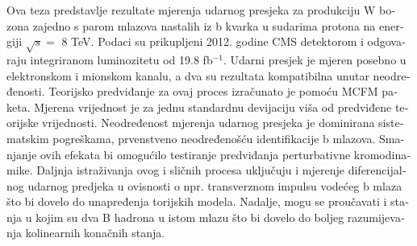 \begin{otherlanguage}{croatian}
Ova teza predstavlje rezultate mjerenja udarnog presjeka za produkciju W bozona zajedno s parom mlazova nastalih iz b kvarka u sudarima protona na energiji $\sqrt{s}=$ 8 TeV. Podaci su prikupljeni 2012. godine CMS detektorom i odgovaraju integriranom luminozitetu od 19.8 fb$^{-1}$. Udarni presjek je mjeren posebno u elektronskom i mionskom kanalu, a dva su rezultata kompatibilna unutar neodređenosti. Teorijsko predviđanje za ovaj proces izračunato je pomoću MCFM paketa. Mjerena vrijednost je za jednu standardnu devijaciju viša od predviđene teorijske vrijednosti. Neodređenost mjerenja udarnog presjeka je dominirana sistematskim pogreškama, prvenstveno neodređenošću identifikacije b mlazova. Smanjanje ovih efekata bi omogućilo testiranje predviđanja perturbativne kromodinamike. Daljnja istraživanja ovog i sličnih procesa uključuju i mjerenje diferencijalnog udarnog predjeka u ovisnosti o npr. transverznom impulsu vodećeg b mlaza što bi dovelo do unapređenja torijskih modela. Nadalje, mogu se proučavati i stanja u kojim su dva B hadrona u istom mlazu što bi dovelo do boljeg razumijevanja kolinearnih konačnih stanja. 

\end{otherlanguage}
